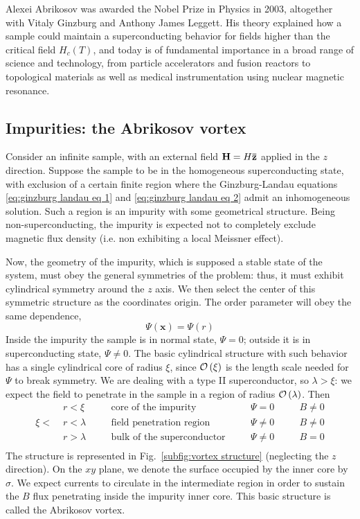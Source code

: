 Alexei Abrikosov was awarded the Nobel Prize in Physics in 2003, altogether with Vitaly Ginzburg and Anthony James Leggett. His theory explained how a sample could maintain a superconducting behavior for fields higher than the critical field $H_c(T)$, and today is of fundamental importance in a broad range of science and technology, from particle accelerators and fusion reactors to topological materials as well as medical instrumentation using nuclear magnetic resonance.

\subsection{Impurities: the Abrikosov vortex}\label{subsec:impurities: the abrikosov vortex}

Consider an infinite sample, with an external field $\mathbf{H}=H \mathbf{\bar{z}}$ applied in the $z$ direction. Suppose the sample to be in the homogeneous superconducting state, with exclusion of a certain finite region where the Ginzburg-Landau equations \eqref{eq:ginzburg landau eq 1} and \eqref{eq:ginzburg landau eq 2} admit an inhomogeneous solution. Such a region is an impurity with some geometrical structure. Being non-superconducting, the impurity is expected not to completely exclude magnetic flux density (i.e. non exhibiting a local Meissner effect).

Now, the geometry of the impurity, which is supposed a stable state of the system, must obey the general symmetries of the problem: thus, it must exhibit cylindrical symmetry around the $z$ axis. We then select the center of this symmetric structure as the coordinates origin. The order parameter will obey the same dependence,
\[
    \Psi(\mathbf{x}) = \Psi(r)
\]
Inside the impurity the sample is in normal state, $\Psi=0$; outside it is in superconducting state, $\Psi\neq0$. The basic cylindrical structure with such behavior has a single cylindrical core of radius $\xi$, since $\mathcal{O}\left({\xi}\right)$ is the length scale needed for $\Psi$ to break symmetry. We are dealing with a type II superconductor, so $\lambda>\xi$: we expect the field to penetrate in the sample in a region of radius $\mathcal{O}\left({\lambda}\right)$. Then
\[
\begin{aligned}
    &r < \xi \quad&&\text{core of the impurity} \quad&&\Psi=0 \quad&&B\neq0 \\
    \xi < \;&r < \lambda \quad&&\text{field penetration region}  \quad&&\Psi\neq0 \quad&&B\neq0 \\
    &r > \lambda \quad&&\text{bulk of the superconductor} \quad&&\Psi\neq0 \quad&&B=0 \\
\end{aligned}
\]
The structure is represented in Fig.~\ref{subfig:vortex structure} (neglecting the $z$ direction). On the $xy$ plane, we denote the surface occupied by the inner core by $\sigma$. We expect currents to circulate in the intermediate region in order to sustain the $B$ flux penetrating inside the impurity inner core. This basic structure is called the Abrikosov vortex.

